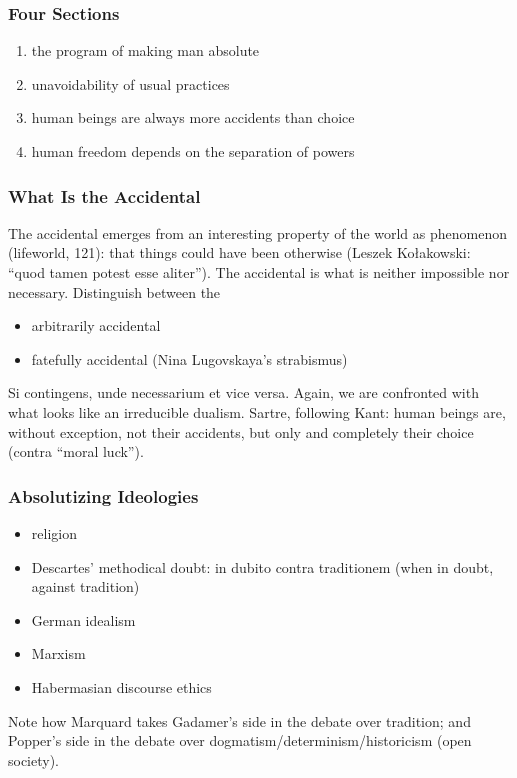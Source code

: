 \documentclass[xcolor=dvipsnames]{beamer}
\begin{document}
\begin{frame}
  \frametitle{Four Sections}
  \begin{enumerate}
  \item the program of making man absolute
  \item unavoidability of usual practices
  \item human beings are always more accidents than choice
  \item human freedom depends on the separation of powers
  \end{enumerate}
\end{frame}

\begin{frame}
  \frametitle{What Is the Accidental}
  The accidental emerges from an interesting property of the world as
  phenomenon (lifeworld, 121): that things could have been otherwise
  (Leszek Ko{\l{}}akowski: ``quod tamen potest esse aliter''). The
  accidental is what is neither impossible nor necessary. Distinguish
  between the
  \begin{itemize}
  \item arbitrarily accidental
  \item fatefully accidental (Nina Lugovskaya's strabismus)
  \end{itemize}
Si contingens, unde necessarium et vice versa. Again, we are
confronted with what looks like an irreducible dualism. Sartre,
following Kant: human beings are, without exception, not their
accidents, but only and completely their choice (contra ``moral
luck''). 
\end{frame}

\begin{frame}
  \frametitle{Absolutizing Ideologies}
  \begin{itemize}
  \item religion
  \item Descartes' methodical doubt: in dubito contra traditionem
    (when in doubt, against tradition)
  \item German idealism
  \item Marxism
  \item Habermasian discourse ethics
  \end{itemize}
Note how Marquard takes Gadamer's side in the debate over tradition;
and Popper's side in the debate over dogmatism/determinism/historicism
(open society). 
\end{frame}
\end{document}
